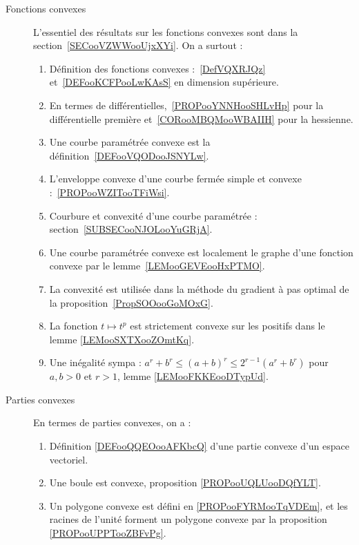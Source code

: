 \begin{description}
	\item[Fonctions convexes]
		L'essentiel des résultats sur les fonctions convexes sont dans la section~\ref{SECooVZWWooUjxXYi}. On a surtout :
		\begin{enumerate}
			\item
			      Définition des fonctions convexes :~\ref{DefVQXRJQz} et~\ref{DEFooKCFPooLwKAsS} en dimension supérieure.
			\item
			      En termes de différentielles,~\ref{PROPooYNNHooSHLvHp} pour la différentielle première et~\ref{CORooMBQMooWBAIIH} pour la hessienne.
			\item
			      Une courbe paramétrée convexe est la définition~\ref{DEFooVQODooJSNYLw}.
			\item
			      L'enveloppe convexe d'une courbe fermée simple et convexe :~\ref{PROPooWZITooTFiWsi}.
			\item
			      Courbure et convexité d'une courbe paramétrée : section~\ref{SUBSECooNJOLooYuGRjA}.
			\item
			      Une courbe paramétrée convexe est localement le graphe d'une fonction convexe par le lemme~\ref{LEMooGEVEooHxPTMO}.
			\item
			      La convexité est utilisée dans la méthode du gradient à pas optimal de la proposition~\ref{PropSOOooGoMOxG}.
			\item
			      La fonction \( t\mapsto t^p\) est strictement convexe sur les positifs dans le lemme \ref{LEMooSXTXooZOmtKq}.
			\item
			      Une inégalité sympa : $a^r+b^r\leq (a+b)^r\leq 2^{r-1}(a^r+b^r)$ pour \( a,b>0\) et \( r>1\), lemme \ref{LEMooFKKEooDTypUd}.
		\end{enumerate}
	\item[Parties convexes]

		En termes de parties convexes, on a :
		\begin{enumerate}
			\item
			      Définition \ref{DEFooQQEOooAFKbcQ} d'une partie convexe d'un espace vectoriel.
			\item
			      Une boule est convexe, proposition \ref{PROPooUQLUooDQfYLT}.
			\item
			      Un polygone convexe est défini en \ref{PROPooFYRMooTqVDEm}, et les racines de l'unité forment un polygone convexe par la proposition \ref{PROPooUPPTooZBFvPg}.
		\end{enumerate}
\end{description}
